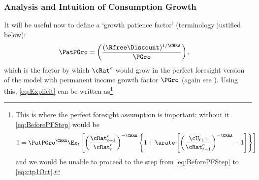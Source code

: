 \documentclass{\handout}
\begin{document}
\subsubsection{Analysis and Intuition of Consumption Growth}
It will be useful now to define a `growth patience factor' (terminology justified below):
\begin{equation}\begin{gathered}\begin{aligned}
  \PatPGro & =  \left(\frac{(\Rfree\Discount)^{1/\CRRA}}{\PGro}\right), \label{eq:PatPGro}
\end{aligned}\end{gathered}\end{equation}
which is the factor by which ${\cRat}^{e}$ would grow in the
perfect foresight version of the model with permanent income growth factor
$\PGro$ (again see ).  
Using this,
\eqref{eq:Explicit} can be written as\footnote{This is where the perfect foresight assumption is important; without it \eqref{eq:BeforePFStep} would be 
\begin{equation}\begin{gathered}\begin{aligned}
 1       & =  \PatPGro^{\CRRA} \Ex_{t}\left[\left(\frac{{\cRat}^{e}_{t+1}}{{\cRat}^{e}_{t}}\right)^{-\CRRA} \left\{1+\urate\left[\left(\frac{\cU_{t+1}}{{\cRat}^{e}_{t+1}}\right)^{-\CRRA}-1\right]\right\}\right] \label{eq:BeforePFStepWithEx}
\end{aligned}\end{gathered}\end{equation}
and we would be unable to proceed to the step from \eqref{eq:BeforePFStep} to \eqref{eq:ctp1Oct}.}
\end{document}
